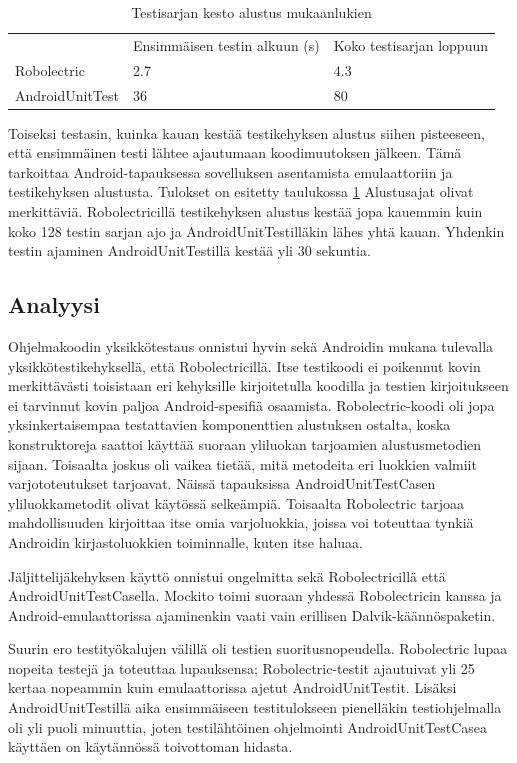 \begin{table}[h]
\centering
\begin{tabular}{ l l l }
   & Ensimmäisen testin alkuun (s) & Koko testisarjan loppuun \\
  Robolectric & 2.7 & 4.3 \\
  AndroidUnitTest & 36 & 80 \\
\end{tabular}
\caption{Testisarjan kesto alustus mukaanlukien}
\label{unittest_startup}
\end{table}

Toiseksi testasin, kuinka kauan kestää testikehyksen alustus siihen pisteeseen, että ensimmäinen testi lähtee ajautumaan koodimuutoksen jälkeen. Tämä tarkoittaa Android-tapauksessa sovelluksen asentamista emulaattoriin ja testikehyksen alustusta. Tulokset on esitetty taulukossa \ref{unittest_startup} Alustusajat olivat merkittäviä. Robolectricillä testikehyksen alustus kestää jopa kauemmin kuin koko 128 testin sarjan ajo ja AndroidUnitTestilläkin lähes yhtä kauan. Yhdenkin testin ajaminen AndroidUnitTestillä kestää yli 30 sekuntia.

\subsection{Analyysi}

Ohjelmakoodin yksikkötestaus onnistui hyvin sekä Androidin mukana tulevalla yksikkötestikehyksellä, että Robolectricillä. Itse testikoodi ei poikennut kovin merkittävästi toisistaan eri kehyksille kirjoitetulla koodilla ja testien kirjoitukseen ei tarvinnut kovin paljoa Android-spesifiä osaamista. Robolectric-koodi oli jopa yksinkertaisempaa testattavien komponenttien alustuksen ostalta, koska konstruktoreja saattoi käyttää suoraan yliluokan tarjoamien alustusmetodien sijaan. Toisaalta joskus oli vaikea tietää, mitä metodeita eri luokkien valmiit varjototeutukset tarjoavat. Näissä tapauksissa AndroidUnitTestCasen yliluokkametodit olivat käytössä selkeämpiä. Toisaalta Robolectric tarjoaa mahdollisuuden kirjoittaa itse omia varjoluokkia, joissa voi toteuttaa tynkiä Androidin kirjastoluokkien toiminnalle, kuten itse haluaa.

Jäljittelijäkehyksen käyttö onnistui ongelmitta sekä Robolectricillä että AndroidUnitTestCasella. Mockito toimi suoraan yhdessä Robolectricin kanssa ja Android-emulaattorissa ajaminenkin vaati vain erillisen Dalvik-käännöspaketin.

Suurin ero testityökalujen välillä oli testien suoritusnopeudella. Robolectric lupaa nopeita testejä ja toteuttaa lupauksensa; Robolectric-testit ajautuivat yli 25 kertaa nopeammin kuin emulaattorissa ajetut AndroidUnitTestit. Lisäksi AndroidUnitTestillä aika ensimmäiseen testitulokseen pienelläkin testiohjelmalla oli yli puoli minuuttia, joten testilähtöinen ohjelmointi AndroidUnitTestCasea käyttäen on käytännössä toivottoman hidasta.

